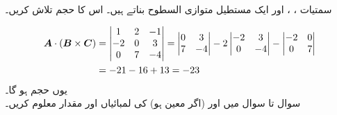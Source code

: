 سمتیات ،  ، اور  ایک مستطیل متوازی السطوح بناتے ہیں۔ اس کا حجم تلاش کریں۔

\begin{align*}
{\ensuremath{{\boldsymbol{A}}}}\cdot({{\boldsymbol{B}}}\times{\ensuremath{{\boldsymbol{C}}}})&=\begin{vmatrix}1&2&-1\\-2&0&3\\0&7&-4\end{vmatrix}=
\begin{vmatrix}0&3\\7&-4\end{vmatrix}-2\begin{vmatrix}-2&3\\0&-4\end{vmatrix}-\begin{vmatrix}-2&0\\0&7\end{vmatrix}\\
&=-21-16+13=-23
\end{align*}
یوں حجم  ہو گا۔
\\
سوال  تا سوال  میں   اور  (اگر معین ہو) کی لمبائیاں اور مقدار معلوم کریں۔ 

